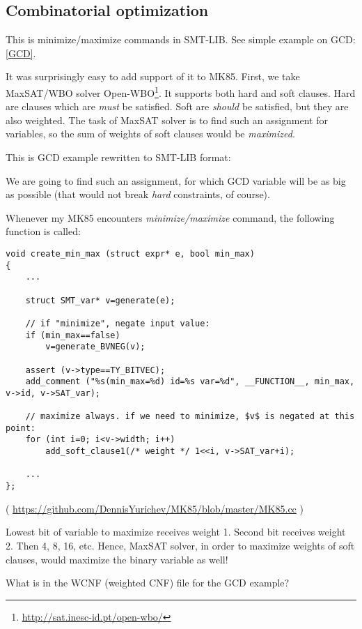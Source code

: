 \subsection{Combinatorial optimization}

This is minimize/maximize commands in SMT-LIB.
See simple example on \ac{GCD}: \ref{GCD}.

It was surprisingly easy to add support of it to MK85.
First, we take MaxSAT/WBO solver Open-WBO\footnote{\url{http://sat.inesc-id.pt/open-wbo/}}.
It supports both hard and soft clauses.
Hard are clauses which are \textit{must} be satisfied.
Soft are \textit{should} be satisfied, but they are also weighted.
The task of MaxSAT solver is to find such an assignment for variables, so the sum of weights of soft clauses would be
\textit{maximized}.

This is GCD example rewritten to SMT-LIB format:



We are going to find such an assignment, for which GCD variable will be as big as possible
(that would not break \textit{hard} constraints, of course).

Whenever my MK85 encounters \textit{minimize/maximize} command, the following function is called:

\begin{lstlisting}[style=customc]
void create_min_max (struct expr* e, bool min_max)
{
	...

	struct SMT_var* v=generate(e);

	// if "minimize", negate input value:
	if (min_max==false)
		v=generate_BVNEG(v);

	assert (v->type==TY_BITVEC);
	add_comment ("%s(min_max=%d) id=%s var=%d", __FUNCTION__, min_max, v->id, v->SAT_var);

	// maximize always. if we need to minimize, $v$ is negated at this point:
	for (int i=0; i<v->width; i++)
		add_soft_clause1(/* weight */ 1<<i, v->SAT_var+i);

	...
};
\end{lstlisting}

( \url{https://github.com/DennisYurichev/MK85/blob/master/MK85.cc} )

Lowest bit of variable to maximize receives weight 1.
Second bit receives weight 2.
Then 4, 8, 16, etc.
Hence, MaxSAT solver, in order to maximize weights of soft clauses, would maximize the binary variable as well!

What is in the WCNF (weighted CNF) file for the GCD example?

